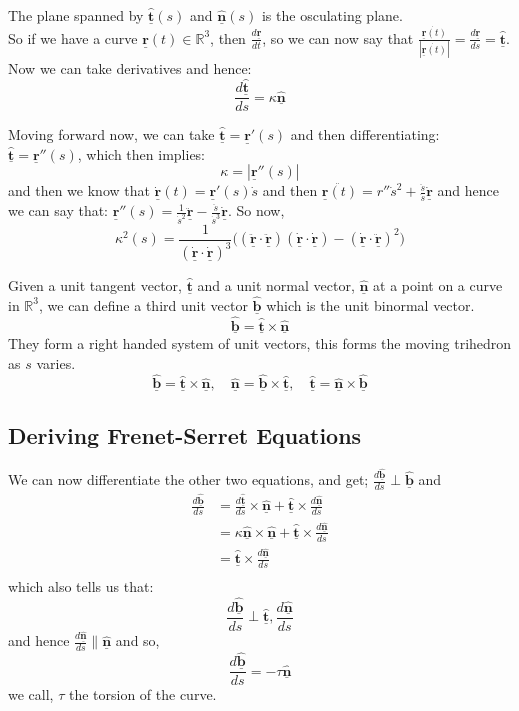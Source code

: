 \documentclass{article}
\newcommand{\R}{\mathbb{R}}
\renewcommand{\vec}[1]{\underline{\textbf{#1}}}
\newcommand{\uvec}[1]{\hat{\underline{\textbf{#1}}}}
\newcommand{\vecn}{\underline{\mathbf{\hat{n}}}}
\renewcommand{\k}{\kappa}
\newcommand{\fd}[2]{\frac{d #1}{d #2}}
\begin{document}
The plane spanned by $\hat{\vec t}(s)$ and $\vecn(s)$ is the osculating plane.\\

So if we have a curve $\vec r(t)\in \R^3$, then $\displaystyle{\fd{\vec r}{t}}$, so we can now say that $\displaystyle{\frac{\dot{\vec r(t)}}{|\dot{\vec r (t)}|} = \fd{\vec r}{s} = \uvec{t}}$. Now we can take derivatives and hence:
$$ \fd{\uvec t}{s} = \kappa \vecn $$

Moving forward now, we can take $\displaystyle{\uvec t = \vec r'(s)}$ and then differentiating: $\displaystyle{\uvec t = \vec r''(s)}$, which then implies:
$$ \kappa = |\vec r''(s)| $$
and then we know that $\displaystyle{\dot{\vec r}(t) = \vec r'(s)\dot{s}}$
 and then $\displaystyle{\ddot{\vec r(t)} = r''\dot{s}^2 + \frac{\ddot{s}}{\dot{s}}\dot{\vec r}}$ and hence we can say that: $\displaystyle{\vec r''(s) = \frac{1}{\dot{s}^2}\ddot{\vec r} - \frac{\ddot{s}}{\dot{s}^3}\dot{\vec r}}$. So now,
 $$ \kappa^2(s) = \frac{1}{(\dot{\vec r}\cdot\dot{\vec r})^3}\big((\ddot{\vec r}\cdot\ddot{\vec r})(\dot{\vec r}\cdot\dot{\vec r}) - (\dot{\vec r}\cdot\ddot{\vec r})^2) $$

 Given a unit tangent vector, $\uvec t$ and a unit normal vector, $\vecn$ at a point on a curve in $\R^3$, we can define a third unit vector $\uvec{b}$ which is the unit binormal vector.
 $$ \uvec b = \uvec t \times \vecn$$
 They form a right handed system of unit vectors, this forms the moving trihedron as $s$ varies.
 $$ \uvec b = \uvec t \times \uvec n,\quad \uvec n = \uvec b \times \uvec t,\quad \uvec t = \uvec n \times \uvec b $$

\subsection{Deriving Frenet-Serret Equations}


 We can now differentiate the other two equations, and get; $\displaystyle{\fd{\uvec b}{s}\perp \uvec b}$ and
\begin{align*}
  \fd{\uvec b}{s} &= \fd{\uvec t}{s} \times \uvec n + \uvec t \times \fd{\uvec n}{s} \\
  &= \k\uvec n \times \uvec n + \uvec t\times \fd{\uvec n}{s} \\
  &= \uvec t \times \fd{\uvec n}{s}\\
\end{align*}
which also tells us that:
$$ \fd{\uvec b}{s} \perp \uvec t, \fd{\uvec n}{s} $$
and hence $\displaystyle{\fd{\uvec n}{s} \parallel \vecn}$ and so,
$$ \fd{\uvec b}{s} = -\tau \uvec n $$
we call, $\tau$ the torsion of the curve.
\end{document}
